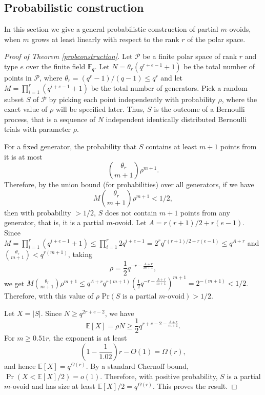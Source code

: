 \documentclass[a4paper,11pt]{amsproc}
\theoremstyle{plain}
\theoremstyle{definition}
\newcommand{\<}{\langle}
\renewcommand{\>}{\rangle} %
\begin{document}
\subsection{Probabilistic construction}\label{sec:constructions}


In this section we give a general probabilistic construction of partial $m$-ovoids, when $m$ grows at least linearly with respect to the rank $r$ of the polar space.



\begin{proof}[Proof of Theorem \ref{probconstruction}]
    Let $\mathcal{P}$ be a finite polar space of rank $r$ and type $e$ over the finite field $\mathbb{F}_q$. 
Let $N = \theta_r (q^{r + e - 1} + 1)$ be the total number of points in $\mathcal{P}$, where $\theta_r = (q^r - 1)/(q - 1) \leq q^r$ and let $M = \prod_{i = 1}^r (q^{i + e - 1} + 1)$ be the total number of generators. 
Pick a random subset $S$ of $\mathcal{P}$ by picking each point independently with probability $\rho$, where the exact value of $\rho$ will be specified later.
Thus, $S$ is the outcome of a Bernoulli process, that is a sequence of $N$ independent identically distributed Bernoulli trials with parameter $\rho$.

For a fixed generator, the probability that $S$ contains at least $m + 1$ points from it is at most
\[\binom{\theta_r}{m + 1}\rho^{m+1}.\]
Therefore, by the union bound (for probabilities) over all generators, if we have 
\[M \binom{\theta_r}{m+1} \rho^{m+1} < 1/2,\] then with probability $> 1/2$, $S$ does not contain $m+1$ points from any generator, that is, it is a partial $m$-ovoid.
Let $A = r(r + 1)/2 + r(e-1)$.
Since $M = \prod_{i = 1}^r (q^{i + e - 1} + 1) \leq \prod_{i = 1}^r 2q^{i + e - 1} = 2^r q^{r(r + 1)/2 + r(e-1)} \leq q^{A + r}$ and $\binom{\theta_r}{m+1} < q^{r(m+1)}$, 
taking \[\rho = \frac12 q^{-r - \frac{A + r}{m+1}},\] we get $M \binom{\theta_r}{m+1} \rho^{m+1} \leq q^{A+r}q^{r(m+1)} \left( \frac12 q^{-r - \frac{A + r}{m+1}} \right)^{m+1} = 2^{-(m+1)} < 1/2$.
Therefore, with this value of $\rho$ $\mathrm{Pr}(S \text{ is a partial }m\text{-ovoid}) > 1/2$.

Let $X=|S|$. Since $N\geq q^{2r+e-2}$, we have \[ \mathbb{E}[X]=\rho N \geq \frac12 q^{r + e - 2 - \frac{A + r}{m+1}}. \] 
For $m\geq 0.51r$, the exponent is at least \[ \left(1-\frac{1}{1.02}\right)r-O(1)=\Omega(r), \] and hence $\mathbb{E}[X]=q^{\Omega(r)}$. By a standard Chernoff bound, $\Pr(X<\mathbb{E}[X]/2)=o(1)$. 
Therefore, with positive probability, $S$ is a partial $m$-ovoid and has size at least $\mathbb{E}[X]/2=q^{\Omega(r)}$. This proves the result.
\end{proof}
\end{document}
